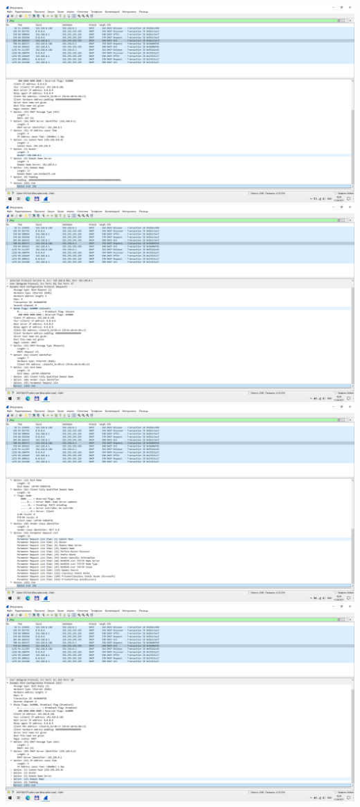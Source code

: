 \includegraphics{screenshots/dhcp_ack1_2}
\includegraphics{screenshots/dhcp_request2_1}
\includegraphics{screenshots/dhcp_request2_2}
\includegraphics{screenshots/dhcp_ack2_1}
